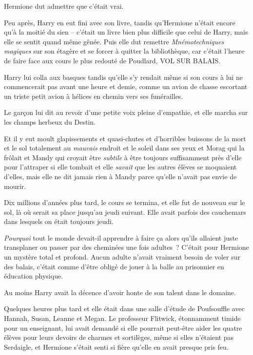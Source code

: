 Hermione dut admettre que c'était vrai.

Peu après, Harry en eut fini avec son livre, tandis qu'Hermione n'était encore qu'à la moitié du sien -- c'était un livre bien plus difficile que celui de Harry, mais elle se sentit quand même gênée. Puis elle dut remettre \emph{Mnémotechniques magiques} sur son étagère et se forcer à quitter la bibliothèque, car c'était l'heure de faire face aux cours le plus redouté de Poudlard, VOL SUR BALAIS.

Harry lui colla aux basques tandis qu'elle s'y rendait même si son cours à lui ne commencerait pas avant une heure et demie, comme un avion de chasse escortant un triste petit avion à hélices en chemin vers ses funérailles.

Le garçon lui dit au revoir d'une petite voix pleine d'empathie, et elle marcha sur les champs herbeux du Destin.

Et il y eut moult glapissements et quasi-chutes et d'horribles buissons de la mort et le sol totalement au \emph{mauvais} endroit et le soleil dans ses yeux et Morag qui la frôlait et Mandy qui croyait être \emph{subtile} à être toujours suffisamment près d'elle pour l'attraper si elle tombait et elle \emph{savait} que les autres élèves se moquaient d'elles, mais elle ne dit jamais rien à Mandy parce qu'elle n'avait pas envie de mourir.

Dix millions d'années plus tard, le cours se termina, et elle fut de nouveau sur le sol, là où serait sa place jusqu'au jeudi suivant. Elle avait parfois des cauchemars dans lesquels on était toujours jeudi.

\emph{Pourquoi} tout le monde devait-il apprendre à faire ça alors qu'ils allaient juste transplaner ou passer par des cheminées une fois adultes~? C'était pour Hermione un mystère total et profond. Aucun adulte n'avait vraiment besoin de voler sur des balais, c'était comme d'être obligé de jouer à la balle au prisonnier en éducation physique.

Au moins Harry avait la décence d'avoir honte de son talent dans le domaine.

\later

Quelques heures plus tard et elle était dans une salle d'étude de Poufsouffle avec Hannah, Susan, Leanne et Megan. Le professeur Flitwick, étonnamment timide pour un enseignant, lui avait demandé si elle pourrait peut-être aider les quatre élèves pour leurs devoirs de charmes et sortilèges, même si elles n'étaient pas Serdaigle, et Hermione s'était senti si fière qu'elle en avait presque pris feu.


